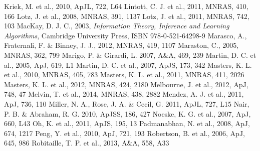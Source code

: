 \documentclass[useAMS,usenatbib]{mn2e}
\begin{document}
\begin{thebibliography}{}
 Kriek, M. et al., 2010, ApJL, 722, L64
 Lintott, C. J. et al., 2011, MNRAS, 410, 166
 Lotz, J. et al., 2008, MNRAS, 391, 1137
 Lotz, J. et al., 2011, MNRAS, 742, 103
 MacKay, D. J. C., 2003, \emph{Information Theory, Inference and Learning Algorithms}, Cambridge University Press, ISBN 978-0-521-64298-9
 Marasco, A., Fraternali, F. \& Binney, J. J., 2012, MNRAS, 419, 1107
 Maraston, C., 2005, MNRAS, 362, 799
 Marigo, P. \& Girardi, L. 2007, A\&A, 469, 239
 Martin, D. C. et al., 2005, ApJ, 619, L1
 Martin, D. C. et al., 2007, ApJS, 173, 342
 Masters, K. L. et al., 2010, MNRAS, 405, 783
 Masters, K. L. et al., 2011, MNRAS, 411, 2026
 Masters, K. L. et al., 2012, MNRAS, 424, 2180
 Melbourne, J. et al., 2012, ApJ, 748, 47
 Melvin, T. et al., 2014, MNRAS, 438, 2882
 Mendez, A. J. et al., 2011, ApJ, 736, 110
 Miller, N. A., Rose, J. A. \& Cecil, G. 2011, ApJL, 727, L15
 Nair, P. B. \& Abraham, R. G. 2010, ApJSS, 186, 427 
 Noeske, K. G. et al., 2007, ApJ, 660, L43
 Oh, K. et al., 2011, ApJS, 195, 13
 Padmanabhan, N. et al., 2008, ApJ, 674, 1217
 Peng, Y. et al., 2010, ApJ, 721, 193
 Robertson, B. et al., 2006, ApJ, 645, 986
 Robitaille, T. P. et al., 2013, A\&A, 558, A33

\end{thebibliography}
\end{document}
